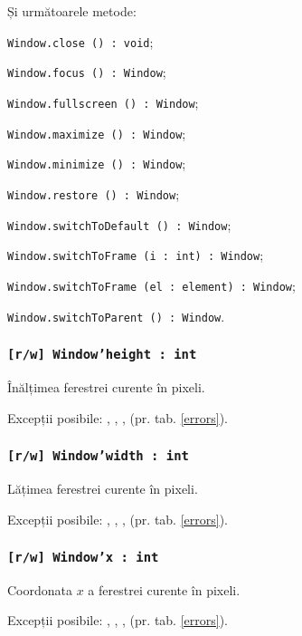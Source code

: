 Și următoarele metode:
\begin{icItems}
	\item \texttt{Window.close () : void};
	\item \texttt{Window.focus () : Window};
	\item \texttt{Window.fullscreen () : Window};
	\item \texttt{Window.maximize () : Window};
	\item \texttt{Window.minimize () : Window};
	\item \texttt{Window.restore () : Window};
	\item \texttt{Window.switchToDefault () : Window};
	\item \texttt{Window.switchToFrame (i : int) : Window};
	\item \texttt{Window.switchToFrame (el : element) : Window};
	\item \texttt{Window.switchToParent () : Window}.
\end{icItems}

\subsubsection{\texttt{[r/w] Window'height : int}}

Înălțimea ferestrei curente în pixeli.

Excepții posibile: , , ,  (pr. tab. \ref{errors}).

\subsubsection{\texttt{[r/w] Window'width : int}}

Lățimea ferestrei curente în pixeli.

Excepții posibile: , , ,  (pr. tab. \ref{errors}).

\subsubsection{\texttt{[r/w] Window'x : int}}

Coordonata $x$ a ferestrei curente în pixeli.

Excepții posibile: , , ,  (pr. tab. \ref{errors}).

